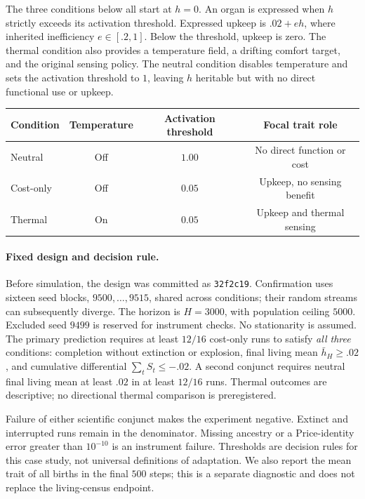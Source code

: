 \documentclass[10pt]{article}
\begin{document}
The three conditions below all start at $h=0$. An organ is expressed when $h$ strictly exceeds its activation threshold. Expressed upkeep is $.02+e h$, where inherited inefficiency $e\in[.2,1]$. Below the threshold, upkeep is zero. The thermal condition also provides a temperature field, a drifting comfort target, and the original sensing policy. The neutral condition disables temperature and sets the activation threshold to $1$, leaving $h$ heritable but with no direct functional use or upkeep.

\begin{center}
\begin{tabular}{lccc}
\toprule
Condition & Temperature & Activation threshold & Focal trait role\\
\midrule
Neutral & Off & $1.00$ & No direct function or cost\\
Cost-only & Off & $0.05$ & Upkeep, no sensing benefit\\
Thermal & On & $0.05$ & Upkeep and thermal sensing\\
\bottomrule
\end{tabular}
\end{center}

\paragraph{Fixed design and decision rule.}
Before simulation, the design was committed as \texttt{32f2c19}. Confirmation uses sixteen seed blocks, $9500,\ldots,9515$, shared across conditions; their random streams can subsequently diverge. The horizon is $H=3000$, with population ceiling $5000$. Excluded seed $9499$ is reserved for instrument checks. No stationarity is assumed. The primary prediction requires at least $12/16$ cost-only runs to satisfy \emph{all three} conditions: completion without extinction or explosion, final living mean $\bar h_H\ge .02$, and cumulative differential $\sum_tS_t\le-.02$. A second conjunct requires neutral final living mean at least $.02$ in at least $12/16$ runs. Thermal outcomes are descriptive; no directional thermal comparison is preregistered.

Failure of either scientific conjunct makes the experiment negative. Extinct and interrupted runs remain in the denominator. Missing ancestry or a Price-identity error greater than $10^{-10}$ is an instrument failure. Thresholds are decision rules for this case study, not universal definitions of adaptation. We also report the mean trait of all births in the final $500$ steps; this is a separate diagnostic and does not replace the living-census endpoint.
\end{document}
